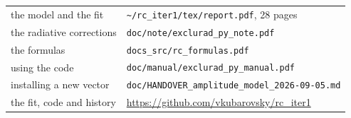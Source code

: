 \documentclass[11pt,a4paper]{article}
\newcommand{\code}[1]{\texttt{#1}}
\begin{document}
\begin{center}
\begin{tabular}{ll}
\toprule
the model and the fit & \code{\textasciitilde/rc\_iter1/tex/report.pdf}, 28 pages\\
the radiative corrections & \code{doc/note/exclurad\_py\_note.pdf}\\
the formulas & \code{docs\_src/rc\_formulas.pdf}\\
using the code & \code{doc/manual/exclurad\_py\_manual.pdf}\\
installing a new vector & \code{doc/HANDOVER\_amplitude\_model\_2026-09-05.md}\\
the fit, code and history & \url{https://github.com/vkubarovsky/rc_iter1}\\
\bottomrule
\end{tabular}
\end{center}
\end{document}
